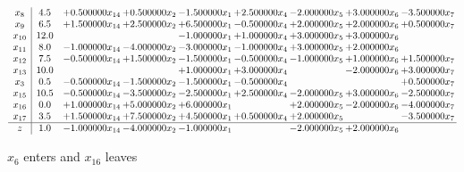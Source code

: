\documentclass[10pt]{article}
\begin{document}
 \[\begin{array}{c| c c@{\hskip 2pt} c@{\hskip 2pt} c@{\hskip 2pt} c@{\hskip 2pt} c@{\hskip 2pt} c@{\hskip 2pt} c@{\hskip 2pt} }
 x_{8}   &  4.5 & + 0.500000 x_{14} & + 0.500000 x_{2} & -1.500000 x_{1} & + 2.500000 x_{4} & -2.000000 x_{5} & + 3.000000 x_{6} & -3.500000 x_{7}\\
 x_{9}   &  6.5 & + 1.500000 x_{14} & + 2.500000 x_{2} & + 6.500000 x_{1} & -0.500000 x_{4} & + 2.000000 x_{5} & + 2.000000 x_{6} & + 0.500000 x_{7}\\
 x_{10}   &  12.0  &    &   & -1.000000 x_{1} & + 1.000000 x_{4} & + 3.000000 x_{5} & + 3.000000 x_{6} &   \\
 x_{11}   &  8.0 & -1.000000 x_{14} & -4.000000 x_{2} & -3.000000 x_{1} & -1.000000 x_{4} & + 3.000000 x_{5} & + 2.000000 x_{6} &   \\
 x_{12}   &  7.5 & -0.500000 x_{14} & + 1.500000 x_{2} & -1.500000 x_{1} & -0.500000 x_{4} & -1.000000 x_{5} & + 1.000000 x_{6} & + 1.500000 x_{7}\\
 x_{13}   &  10.0  &    &   & + 1.000000 x_{1} & + 3.000000 x_{4} &   & -2.000000 x_{6} & + 3.000000 x_{7}\\
 x_{3}   &  0.5 & -0.500000 x_{14} & -1.500000 x_{2} & -1.500000 x_{1} & -0.500000 x_{4} &    &   & + 0.500000 x_{7}\\
 x_{15}   &  10.5 & -0.500000 x_{14} & -3.500000 x_{2} & -2.500000 x_{1} & + 2.500000 x_{4} & -2.000000 x_{5} & + 3.000000 x_{6} & -2.500000 x_{7}\\
 x_{16}   &  0.0 & + 1.000000 x_{14} & + 5.000000 x_{2} & + 6.000000 x_{1} &   & + 2.000000 x_{5} & -2.000000 x_{6} & -4.000000 x_{7}\\
 x_{17}   &  3.5 & + 1.500000 x_{14} & + 7.500000 x_{2} & + 4.500000 x_{1} & + 0.500000 x_{4} & + 2.000000 x_{5} &   & -3.500000 x_{7}\\
\hline
z    &  1.0 & -1.000000 x_{14} & -4.000000 x_{2} & -1.000000 x_{1} &   & -2.000000 x_{5} & + 2.000000 x_{6} &   \\
\end{array}\]


 $ x_{6} $ enters and $ x_{16} $ leaves 
\end{document}
